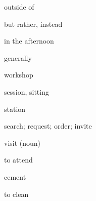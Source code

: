 \documentclass[avery5371,grid,frame]{flashcards}
\begin{document}
\begin{flashcard}{\LARGE outside of}
\LARGE {}
\end{flashcard}
\begin{flashcard}{\LARGE but rather, instead}
\LARGE {}
\end{flashcard}
\begin{flashcard}{\LARGE in the afternoon}
\LARGE {}
\end{flashcard}
\begin{flashcard}{\LARGE generally}
\LARGE {}
\end{flashcard}
\begin{flashcard}{\LARGE workshop}
\LARGE {}
\end{flashcard}
\begin{flashcard}{\LARGE session, sitting}
\LARGE {}
\end{flashcard}
\begin{flashcard}{\LARGE station}
\LARGE {}
\end{flashcard}
\begin{flashcard}{\LARGE search; request; order; invite}
\LARGE {}
\end{flashcard}
\begin{flashcard}{\LARGE visit (noun)}
\LARGE {}
\end{flashcard}
\begin{flashcard}{\LARGE to attend}
\LARGE {}
\end{flashcard}
\begin{flashcard}{\LARGE cement}
\LARGE {}
\end{flashcard}
\begin{flashcard}{\LARGE to clean}
\LARGE {}
\end{flashcard}
\end{document}
